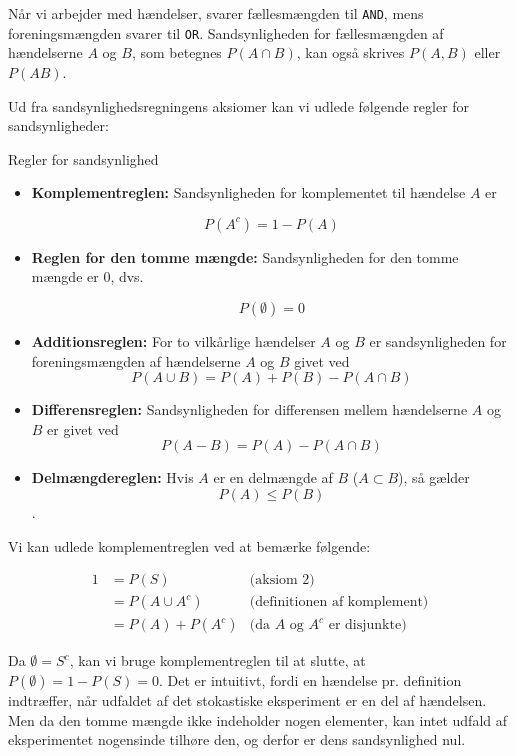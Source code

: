 Når vi arbejder med hændelser, svarer fællesmængden til \texttt{AND}, mens foreningsmængden svarer til \texttt{OR}. Sandsynligheden for fællesmængden af hændelserne $A$ og $B$, som betegnes $P(A \cap B)$, kan også skrives $P(A, B)$ eller $P(A B)$.

Ud fra sandsynlighedsregningens aksiomer kan vi udlede følgende regler for sandsynligheder:

\begin{theorem}{Regler for sandsynlighed}
    \begin{itemize}
        \item \textbf{Komplementreglen:} Sandsynligheden for komplementet til hændelse $A$ er
    
        \[
        P(A^c) = 1 - P(A)
        \]

        \item \textbf{Reglen for den tomme mængde:} Sandsynligheden for den tomme mængde er 0, dvs.
        
        \[P(\emptyset) = 0\]
        
        \item \textbf{Additionsreglen:} For to vilkårlige hændelser $A$ og $B$ er sandsynligheden for foreningsmængden af hændelserne $A$ og $B$ givet ved
        \[
        P(A \cup B) = P(A) + P(B) - P(A \cap B)
        \]

        \item \textbf{Differensreglen:} Sandsynligheden for differensen mellem hændelserne $A$ og $B$ er givet ved
        \[
        P(A-B)=P(A)-P(A \cap B)
        \]
        \item \textbf{Delmængdereglen:} Hvis $A$ er en delmængde af $B$ ($A \subset B$), så gælder
        \[P(A) \leq P(B)\].
    \end{itemize}
\end{theorem}

Vi kan udlede komplementreglen ved at bemærke følgende:

\begin{align*}
    1 &= P(S) & \text{(aksiom 2)} \\
      &= P(A \cup A^c) & \text{(definitionen af komplement)} \\
      &= P(A) + P(A^c) & \text{(da } A \text{ og } A^c \text{ er disjunkte)}
\end{align*}

Da $\emptyset=S^c$, kan vi bruge komplementreglen til at slutte, at $P(\emptyset)=1-P(S)=0$. Det er intuitivt, fordi en hændelse pr. definition indtræffer, når udfaldet af det stokastiske eksperiment er en del af hændelsen. Men da den tomme mængde ikke indeholder nogen elementer, kan intet udfald af eksperimentet nogensinde tilhøre den, og derfor er dens sandsynlighed nul.

